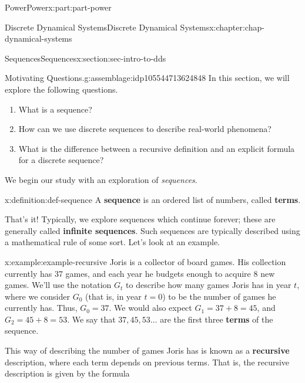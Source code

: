\documentclass[oneside,10pt,]{book}
\newcommand{\terminology}[1]{\textbf{#1}}
\numberwithin{equation}{section}
\begin{document}
\begin{partptx}{Power}{}{Power}{}{}{x:part:part-power}
%
\typeout{************************************************}
\typeout{************************************************}
%
\begin{chapterptx}{Discrete Dynamical Systems}{}{Discrete Dynamical Systems}{}{}{x:chapter:chap-dynamical-systems}
%
%
\typeout{************************************************}
\typeout{************************************************}
%
\begin{sectionptx}{Sequences}{}{Sequences}{}{}{x:section:sec-intro-to-dds}
\begin{assemblage}{Motivating Questions.}{g:assemblage:idp105544713624848}%
In this section, we will explore the following questions. %
\begin{enumerate}
\item{}What is a sequence?%
\item{}How can we use discrete sequences to describe real-world phenomena?%
\item{}What is the difference between a recursive definition and an explicit formula for a discrete sequence?%
\end{enumerate}
%
\end{assemblage}
We begin our study with an exploration of \emph{sequences}.%
\begin{definition}{}{x:definition:def-sequence}%
%
%
A \terminology{sequence} is an ordered list of numbers, called \terminology{terms}.%
\end{definition}
That's it! Typically, we explore sequences which continue forever; these are generally called \terminology{infinite sequences}. Such sequences are typically described using a mathematical rule of some sort. Let's look at an example.%
\begin{example}{}{x:example:example-recursive}%
Joris is a collector of board games. His collection currently has 37 games, and each year he budgets enough to acquire 8 new games. We'll use the notation \(G_t\) to describe how many games Joris has in year \(t\), where we consider \(G_0\) (that is, in year \(t=0\)) to be the number of games he currently has. Thus, \(G_0 = 37\). We would also expect \(G_1 = 37 + 8 = 45\), and \(G_2 = 45 + 8 = 53\). We say that \(37, 45, 53\ldots\) are the first three \terminology{terms} of the sequence.%
\par
This way of describing the number of games Joris has is known as a \terminology{recursive} description, where each term depends on previous terms. That is, the recursive description is given by the formula%

\end{example}
\end{sectionptx}
\end{chapterptx}
\end{partptx}
\end{document}
